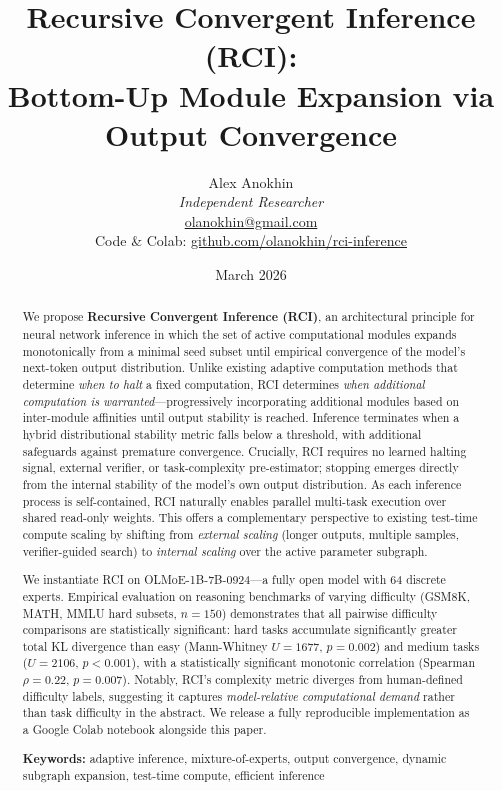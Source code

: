 \documentclass{article}
\title{\textbf{Recursive Convergent Inference (RCI):}\\
Bottom-Up Module Expansion via Output Convergence}
\author{
    Alex Anokhin \\
    \textit{Independent Researcher} \\
    \href{mailto:olanokhin@gmail.com}{olanokhin@gmail.com} \\[4pt]
    \small Code \& Colab:
    \href{https://github.com/olanokhin/rci-inference}
         {github.com/olanokhin/rci-inference}
}
\date{March 2026}
\begin{document}
\maketitle

\begin{abstract}
We propose \textbf{Recursive Convergent Inference (RCI)}, an
architectural principle for neural network inference in which the
set of active computational modules expands monotonically from a
minimal seed subset until empirical convergence of the model's
next-token output distribution.
Unlike existing adaptive computation methods that determine
\textit{when to halt} a fixed computation, RCI determines
\textit{when additional computation is warranted}---progressively
incorporating additional modules based on inter-module affinities
until output stability is reached.
Inference terminates when a hybrid distributional stability metric
falls below a threshold, with additional safeguards against
premature convergence.
Crucially, RCI requires no learned halting signal, external
verifier, or task-complexity pre-estimator; stopping emerges
directly from the internal stability of the model's own output
distribution.
As each inference process is self-contained, RCI naturally enables
parallel multi-task execution over shared read-only weights.
This offers a complementary perspective to existing test-time
compute scaling by shifting from \textit{external scaling}
(longer outputs, multiple samples, verifier-guided search) to
\textit{internal scaling} over the active parameter subgraph.

We instantiate RCI on OLMoE-1B-7B-0924---a fully open model with
64 discrete experts.
Empirical evaluation on reasoning benchmarks of varying difficulty
(GSM8K, MATH, MMLU hard subsets, $n{=}150$) demonstrates that all
pairwise difficulty comparisons are statistically significant:
hard tasks accumulate significantly greater total KL divergence
than easy (Mann-Whitney $U{=}1677$, $p{=}0.002$) and medium tasks
($U{=}2106$, $p{<}0.001$), with a statistically significant
monotonic correlation (Spearman $\rho{=}0.22$, $p{=}0.007$).
Notably, RCI's complexity metric diverges from human-defined
difficulty labels, suggesting it captures \textit{model-relative
computational demand} rather than task difficulty in the abstract.
We release a fully reproducible implementation as a Google Colab
notebook alongside this paper.

\textbf{Keywords:} adaptive inference, mixture-of-experts,
output convergence, dynamic subgraph expansion, test-time compute,
efficient inference
\end{abstract}
\end{document}
